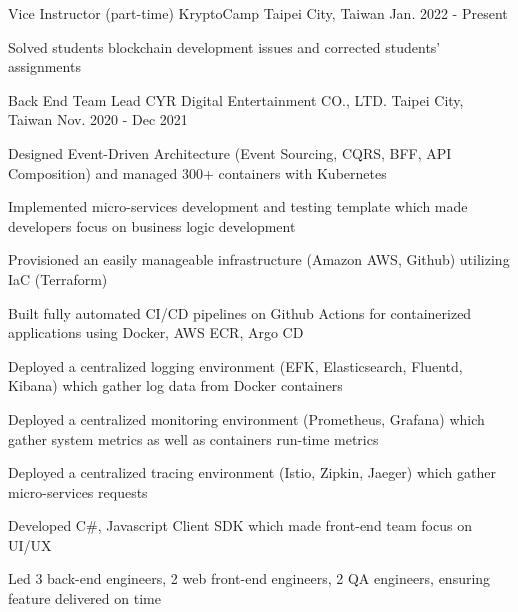 
\begin{cventries}
  \cventry
    {Vice Instructor (part-time)} %
    {KryptoCamp} %
    {Taipei City, Taiwan} %
    {Jan. 2022 - Present} %
    {
      \begin{cvitems} %
        \item {Solved students blockchain development issues and corrected students' assignments}
      \end{cvitems}
    }

  \cventry
    {Back End Team Lead} %
    {CYR Digital Entertainment CO., LTD.} %
    {Taipei City, Taiwan} %
    {Nov. 2020 - Dec 2021} %
    {
      \begin{cvitems} %
        \item {Designed Event-Driven Architecture (Event Sourcing, CQRS, BFF, API Composition) and managed 300+ containers with Kubernetes}
        \item {Implemented micro-services development and testing template which made developers focus on business logic development}
        \item {Provisioned an easily manageable infrastructure (Amazon AWS, Github) utilizing IaC (Terraform)}
        \item {Built fully automated CI/CD pipelines on Github Actions for containerized applications using Docker, AWS ECR, Argo CD}
        \item {Deployed a centralized logging environment (EFK, Elasticsearch, Fluentd, Kibana) which gather log data from Docker containers}
        \item {Deployed a centralized monitoring environment (Prometheus, Grafana) which gather system metrics as well as containers run-time metrics}
        \item {Deployed a centralized tracing environment (Istio, Zipkin, Jaeger) which gather micro-services requests}
        \item {Developed C\#, Javascript Client SDK which made front-end team focus on UI/UX}
        \item {Led 3 back-end engineers, 2 web front-end engineers, 2 QA engineers, ensuring feature delivered on time}
      \end{cvitems}
    }
    

\end{cventries}
